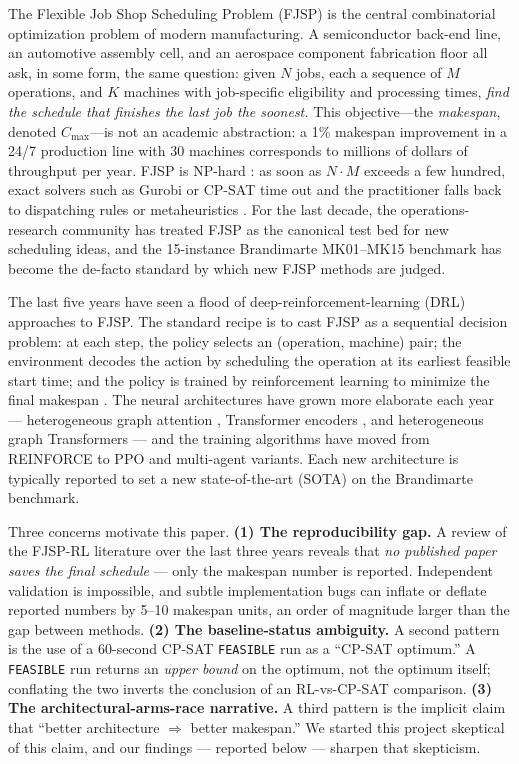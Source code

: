 \documentclass[10pt]{article}
\theoremstyle{definition}
\begin{document}
The Flexible Job Shop Scheduling Problem (FJSP) is
the central combinatorial optimization problem of
modern manufacturing.
A semiconductor back-end line, an automotive
assembly cell, and an aerospace component
fabrication floor all ask, in some form, the same
question: given $N$ jobs, each a sequence of
$M$ operations, and $K$ machines with
job-specific eligibility and processing times,
\emph{find the schedule that finishes the last job
the soonest.} This objective---the \emph{makespan},
denoted $C_{\max}$---is not an academic abstraction:
a 1\% makespan improvement in a 24/7 production
line with 30 machines corresponds to millions of
dollars of throughput per year. FJSP is
NP-hard \citep{Garey1976, Brucker1990}: as soon as
$N \cdot M$ exceeds a few hundred, exact solvers
such as Gurobi or CP-SAT time out and the
practitioner falls back to dispatching rules or
metaheuristics \citep{Blackstone1982, Holthaus1997}.
For the last decade, the operations-research
community has treated FJSP as the canonical test
bed for new scheduling ideas, and the
15-instance Brandimarte MK01--MK15 benchmark
\citep{Brandimarte1993} has become the de-facto
standard by which new FJSP methods are judged.

The last five years have seen a flood of
deep-reinforcement-learning (DRL) approaches to
FJSP. The standard recipe is to cast FJSP as a
sequential decision problem: at each step, the
policy selects an (operation, machine) pair;
the environment decodes the action by
scheduling the operation at its earliest feasible
start time; and the policy is trained by
reinforcement learning to minimize the final
makespan \citep{Zhang2020L2D, Lei2022, Song2022TII,
Yang2024}. The neural architectures have grown
more elaborate each year --- heterogeneous graph
attention \citep{Hu2020HGT, Lei2022},
Transformer encoders \citep{Kool2019, Vaswani2017},
and heterogeneous graph Transformers
\citep{Yang2024} --- and the training algorithms
have moved from REINFORCE \citep{Williams1992} to
PPO \citep{Schulman2017PPO} and multi-agent
variants. Each new architecture is typically
reported to set a new state-of-the-art (SOTA) on
the Brandimarte benchmark.

Three concerns motivate this paper.
\textbf{(1) The reproducibility gap.}
A review of the FJSP-RL literature over the last
three years reveals that \emph{no published paper
saves the final schedule} --- only the makespan
number is reported. Independent validation is
impossible, and subtle implementation bugs can
inflate or deflate reported numbers by 5--10
makespan units, an order of magnitude larger
than the gap between methods.
\textbf{(2) The baseline-status ambiguity.}
A second pattern is the use of a 60-second
CP-SAT \texttt{FEASIBLE} run as a ``CP-SAT
optimum.'' A \texttt{FEASIBLE} run returns an
\emph{upper bound} on the optimum, not the
optimum itself; conflating the two inverts the
conclusion of an RL-vs-CP-SAT comparison.
\textbf{(3) The architectural-arms-race narrative.}
A third pattern is the implicit claim that
``better architecture $\Rightarrow$ better
makespan.'' We started this project skeptical
of this claim, and our findings --- reported
below --- sharpen that skepticism.
\end{document}
